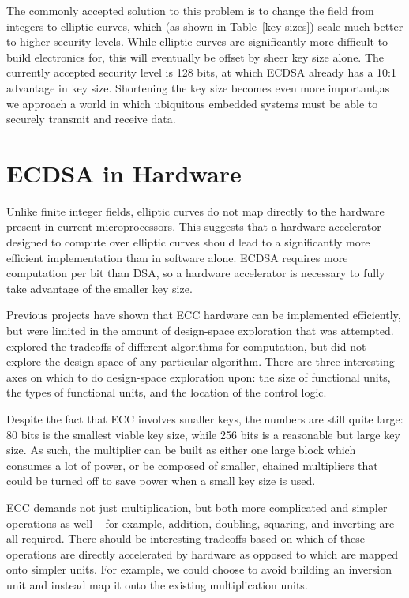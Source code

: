 \documentclass[twocolumn]{article}
\begin{document}
The commonly accepted solution to this problem is to change the field
from integers to elliptic curves, which (as shown in
Table~\ref{key-sizes}) scale much better to higher security levels.
While elliptic curves are significantly more difficult to build
electronics for, this will eventually be offset by sheer key size
alone.  The currently accepted security level is 128 bits, at which
ECDSA already has a 10:1 advantage in key size. Shortening the key 
size becomes even more important,as we approach a world in which 
ubiquitous embedded systems must be able to securely transmit and 
receive data.  

\section{ECDSA in Hardware}

Unlike finite integer fields, elliptic curves do not map directly to
the hardware present in current microprocessors\cite{kss-ecdsa}. This
suggests that a hardware accelerator designed to compute over elliptic
curves should lead to a significantly more efficient implementation
than in software alone. ECDSA requires more computation per bit than DSA, 
so a hardware accelerator is necessary to fully take advantage of the 
smaller key size. 

Previous projects\cite{nnll-ecdsa_hw} have shown that ECC hardware can
be implemented efficiently, but were limited in the amount of
design-space exploration that was attempted. \cite{mmm-hw_ecc} explored 
the tradeoffs of different algorithms for computation, but did not explore 
the design space of any particular algorithm.  There
are three interesting axes on which to do design-space exploration
upon: the size of functional units, the types of functional units, and
the location of the control logic.

Despite the fact that ECC involves smaller keys, the numbers are still
quite large: 80 bits is the smallest viable key size, while 256 bits
is a reasonable but large key size.  As such, the multiplier can be built 
as either one large block  which consumes a lot of power, or be composed of 
smaller, chained multipliers that could be turned off to save power when a
small key size is used.

ECC demands not just multiplication, but both more complicated and
simpler operations as well -- for example, addition, doubling,
squaring, and inverting are all required.  There should be interesting
tradeoffs based on which of these operations are directly accelerated
by hardware as opposed to which are mapped onto simpler units.  For
example, we could choose to avoid building an inversion unit and
instead map it onto the existing multiplication units.
\end{document}
